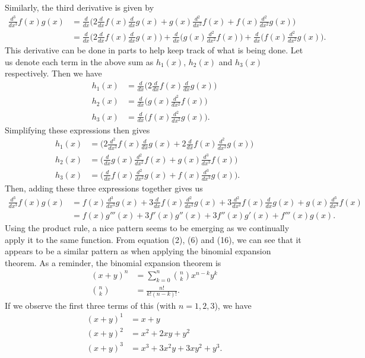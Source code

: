 Similarly, the third derivative is given by
\begin{align}
	\frac{d^3}{dx^3}f(x)g(x)&=\frac{d}{dx}\bigg(2\frac{d}{dx}f(x)\frac{d}{dx}g(x)+g(x)\frac{d^2}{dx^2}f(x)+f(x)\frac{d^2}{dx^2}g(x)\bigg) \\
	&=\frac{d}{dx}\bigg(2\frac{d}{dx}f(x)\frac{d}{dx}g(x)\bigg)+\frac{d}{dx}\bigg(g(x)\frac{d^2}{dx^2}f(x)\bigg)+\frac{d}{dx}\bigg(f(x)\frac{d^2}{dx^2}g(x)\bigg).
\end{align}
This derivative can be done in parts to help keep track of what is being done. Let us denote each term in the above sum as $h_1(x)$, $h_2(x)$ and $h_3(x)$ respectively. Then we have
\begin{align}
	h_1(x)&= \frac{d}{dx}\bigg(2\frac{d}{dx}f(x)\frac{d}{dx}g(x)\bigg) \\
	h_2(x)&=\frac{d}{dx}\bigg(g(x)\frac{d^2}{dx^2}f(x)\bigg) \\
	h_3(x)&=\frac{d}{dx}\bigg(f(x)\frac{d^2}{dx^2}g(x)\bigg).
\end{align}
Simplifying these expressions then gives
\begin{align}
	h_1(x)&= \bigg(2\frac{d^2}{dx^2}f(x)\frac{d}{dx}g(x)+2\frac{d}{dx}f(x)\frac{d^2}{dx^2}g(x)\bigg) \\
	h_2(x)&=\bigg(\frac{d}{dx}g(x)\frac{d^2}{dx^2}f(x)+g(x)\frac{d^3}{dx^3}f(x)\bigg) \\
	h_3(x)&=\bigg(\frac{d}{dx}f(x)\frac{d^2}{dx^2}g(x)+f(x)\frac{d^3}{dx^3}g(x)\bigg).
\end{align}
Then, adding these three expressions together gives us
\begin{align}
	\frac{d^3}{dx^3}f(x)g(x)&=f(x)\frac{d^3}{dx^3}g(x)+3\frac{d}{dx}f(x)\frac{d^2}{dx^2}g(x)+3\frac{d^2}{dx^2}f(x)\frac{d}{dx}g(x)+g(x)\frac{d^3}{dx^3}f(x)\\
	&=f(x)g'''(x)+3f'(x)g''(x)+3f''(x)g'(x)+f'''(x)g(x).
\end{align}
Using the product rule, a nice pattern seems to be emerging as we continually apply it to the same function. From equation (2), (6) and (16), we can see that it appears to be a similar pattern as when applying the binomial expansion theorem. As a reminder, the binomial expansion theorem is
\begin{align}
	(x+y)^n&=\sum_{k=0}^{n}{{n}\choose{k}}x^{n-k}y^k \\
	{{n}\choose{k}}&= \frac{n!}{k!(n-k)!}.
\end{align}
If we observe the first three terms of this (with $n=1,2,3$), we have
\begin{align}
	(x+y)^1&=x+y\\
	(x+y)^2&= x^2+2xy+y^2 \\
	(x+y)^3 &= x^3+3x^2y+3xy^2+y^3.
\end{align}
